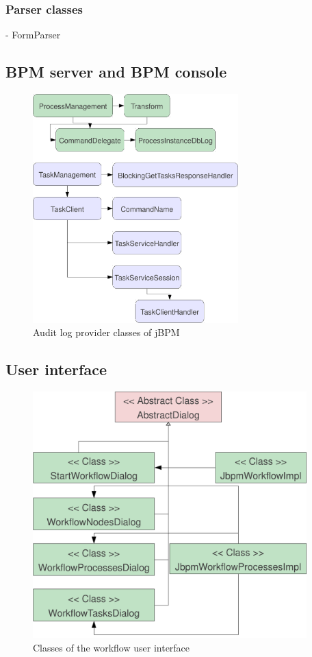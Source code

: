 \subsubsection*{Parser classes}

- FormParser

\subsection{BPM server and BPM console}

\begin{figure}[p]
\centering
\includegraphics[width=300px,keepaspectratio]{jbpm-modified-classes.pdf}
\caption{Audit log provider classes of jBPM}
\label{fig:jbpm-modified-classes}
\end{figure}

\subsection{User interface}

\begin{figure}[p]
\centering
\includegraphics[width=400px,keepaspectratio]{design-wfui.pdf}
\caption{Classes of the workflow user interface}
\label{fig:design-wfui}
\end{figure}
